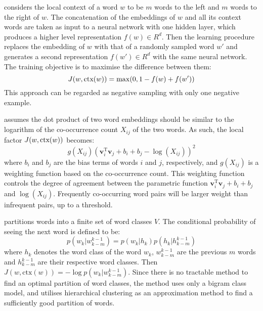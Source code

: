 \CW considers the local context of a word $w$ to be $m$ words to the left
and $m$ words to the right of $w$. The concatenation of the embeddings of
$w$ and all its context words are taken as input to a neural network
with one hidden layer, which produces a higher level representation
$f(w) \in R^d$. Then the learning procedure replaces the embedding of
$w$ with that of a randomly sampled word $w'$ and generates a second
representation $f(w') \in R^d$ with the same neural network. The
training objective is to maximise the difference between them:
\begin{displaymath}
J(w, \text{ctx}(w)) = \max (0, 1 - f(w) + f(w'))
\end{displaymath}
This approach can be regarded as negative sampling with only one negative example.

\Glove assumes the dot product of two word embeddings should be similar
to the logarithm of the co-occurrence count $X_{ij}$ of the two
words. As such, the local factor $J(w, \text{ctx}(w))$ becomes:
\begin{displaymath}
g(X_{ij}) (\mathbf{v}_i^{\text{T}} \mathbf{v}_j + b_i + b_j - \log(X_{ij}))^2
\end{displaymath}
where $b_i$ and $b_j$ are the bias terms of words $i$ and $j$,
respectively, and $g(X_{ij})$ is a weighting function based on the
co-occurrence count. This weighting function controls the degree of
agreement between the parametric function $\mathbf{v}_i^{\text{T}}
\mathbf{v}_j + b_i + b_j $ and $\log(X_{ij})$. Frequently co-occurring
word pairs will be larger weight
than infrequent
pairs, up to a threshold.

\brown partitions words into a finite set of word classes $V$. The
conditional probability of seeing the next word is defined to be:
\begin{displaymath}
p(w_k | w_{k - m}^{k -1}) = p(w_k | h_k) p(h_k | h_{k - m}^{k -1})
\end{displaymath}
where $h_k$ denotes the word class of the word $w_k$, $w_{k - m}^{k -1}$
are the previous $m$ words and $h_{k - m}^{k -1}$ are their respective
word classes. Then $J(w, \text{ctx}(w)) = - \log p(w_k | w_{k - m}^{k
  -1}) $. Since there is no tractable method to find an optimal
partition of word classes, the method uses only a bigram class model, and utilises hierarchical clustering as an approximation method to find a sufficiently good partition of words. 




